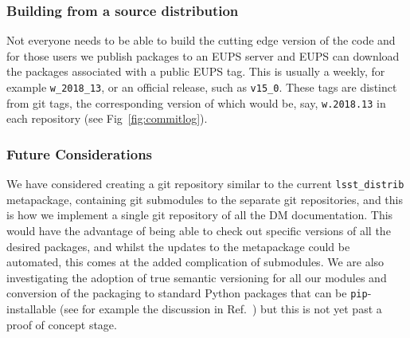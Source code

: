 \subsubsection{Building from a source distribution}

Not everyone needs to be able to build the cutting edge version of the code and for those users we publish packages to an EUPS server and EUPS can download the packages associated with a public EUPS tag.
This is usually a weekly, for example \texttt{w\_2018\_13}, or an official release, such as \texttt{v15\_0}.
These tags are distinct from git tags, the corresponding version of which would be, say, \texttt{w.2018.13} in each repository (see Fig~\ref{fig:commitlog}).

\subsubsection{Future Considerations}

We have considered creating a git repository similar to the current \texttt{lsst\_distrib} metapackage, containing git submodules to the separate git repositories, and this is how we implement a single git repository of all the DM documentation.
This would have the advantage of being able to check out specific versions of all the desired packages, and whilst the updates to the metapackage could be automated, this comes at the added complication of submodules.
We are also investigating the adoption of true semantic versioning\cite{semver} for all our modules and conversion of the packaging to standard Python packages that can be \texttt{pip}-installable (see for example the discussion in Ref.~) but this is not yet past a proof of concept stage.
